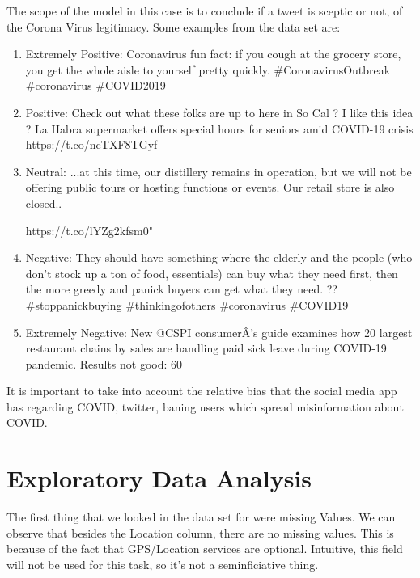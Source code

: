 \documentclass[11pt, a4paper]{article}
\begin{document}
\begin{large}
The scope of the model in this case is to conclude if a tweet is sceptic or not, of the Corona Virus legitimacy. Some examples from the data set are:
\begin{enumerate}
    \item Extremely Positive:  Coronavirus fun fact: if you cough at the grocery store, you get the whole aisle to yourself pretty quickly. \#CoronavirusOutbreak \#coronavirus \#COVID2019
    \item Positive:  Check out what these folks are up to here in So Cal ? I like this idea ?
La Habra supermarket offers special hours for seniors amid COVID-19 crisis https://t.co/ncTXF8TGyf
    \item Neutral: ...at this time, our distillery remains in operation, but we will not be offering public tours or hosting functions or events. Our retail store is also closed..

https://t.co/lYZg2kfsm0"

    \item Negative: They should have something where the elderly and the people (who don't stock up a ton of food, essentials) can buy what they need first,  then  the more greedy and panick buyers can get what they need. ?? \#stoppanickbuying \#thinkingofothers \#coronavirus \#COVID19

    \item Extremely Negative: New @CSPI consumerÂ’s guide examines how 20 largest restaurant chains by sales are handling paid sick leave during COVID-19 pandemic. Results not good: 60%

\end{enumerate}

It is important to take into account the relative bias that the social media app has regarding COVID, twitter, baning users which spread misinformation about COVID. 
\newpage
\section{Exploratory Data Analysis}

The first thing that we looked in the data set for were missing Values. We can observe that besides the Location column, there are no missing values. This is because of the fact that GPS/Location services are optional. Intuitive, this field will not be used for this task, so it's not a seminficiative thing. 


\end{large}
\end{document}
